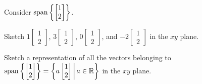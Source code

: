 \begin{applicationActivities}
\begin{activity}{10}
  Consider \(\operatorname{span}\left\{\begin{bmatrix}1\\2\end{bmatrix}\right\}\).
  \begin{subactivity}
    Sketch
    \(1\begin{bmatrix}1\\2\end{bmatrix}\),
    \(3\begin{bmatrix}1\\2\end{bmatrix}\),
    \(0\begin{bmatrix}1\\2\end{bmatrix}\),
    and \(-2\begin{bmatrix}1\\2\end{bmatrix}\) in the \(xy\) plane.
  \end{subactivity}
  \begin{subactivity}
    Sketch a representation of all the vectors belonging to
    \(
      \operatorname{span}\left\{\begin{bmatrix}1\\2\end{bmatrix}\right\}
        =
      \left\{a\begin{bmatrix}1\\2\end{bmatrix}\,\middle|\,a\in\mathbb{R}\right\}
    \)
    in the \(xy\) plane.
  \end{subactivity}
\end{activity}






\end{applicationActivities}
